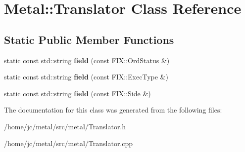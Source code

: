 \hypertarget{classMetal_1_1Translator}{}\section{Metal\+:\+:Translator Class Reference}
\label{classMetal_1_1Translator}
\subsection*{Static Public Member Functions}
\begin{DoxyCompactItemize}
\item 
\hypertarget{classMetal_1_1Translator_a3a9953b65baf38dbc4c2ea835a005cf5}{}static const std\+::string {\bfseries field} (const F\+I\+X\+::\+Ord\+Status \&)\label{classMetal_1_1Translator_a3a9953b65baf38dbc4c2ea835a005cf5}

\item 
\hypertarget{classMetal_1_1Translator_a726f01b6ba7f36a0c77ab2fb098acf37}{}static const std\+::string {\bfseries field} (const F\+I\+X\+::\+Exec\+Type \&)\label{classMetal_1_1Translator_a726f01b6ba7f36a0c77ab2fb098acf37}

\item 
\hypertarget{classMetal_1_1Translator_a8297f6329e8de18e50547746ea84ee59}{}static const std\+::string {\bfseries field} (const F\+I\+X\+::\+Side \&)\label{classMetal_1_1Translator_a8297f6329e8de18e50547746ea84ee59}

\end{DoxyCompactItemize}


The documentation for this class was generated from the following files\+:\begin{DoxyCompactItemize}
\item 
/home/jc/metal/src/metal/Translator.\+h\item 
/home/jc/metal/src/metal/Translator.\+cpp\end{DoxyCompactItemize}
